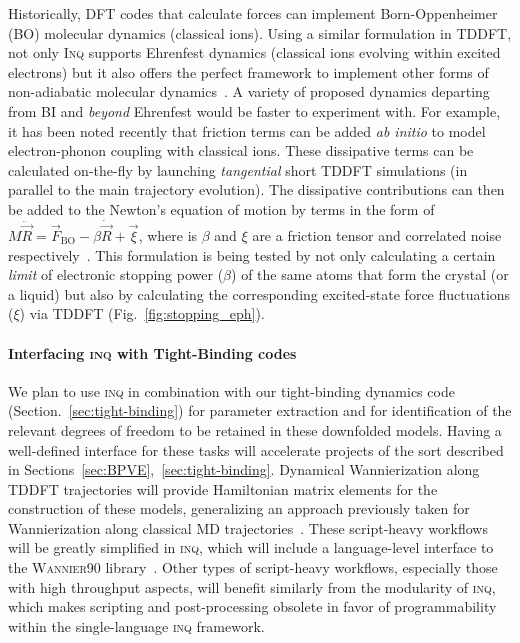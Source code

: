 Historically, DFT codes that calculate forces can implement Born-Oppenheimer (BO) molecular dynamics (classical ions).
Using a similar formulation in TDDFT, not only \textsc{Inq} supports Ehrenfest dynamics (classical ions evolving within excited electrons) but it also offers the perfect framework to implement other forms of non-adiabatic molecular dynamics~\cite{Tapavicza2013,Curchod2018}. 
A variety of proposed dynamics departing from BI and \emph{beyond} Ehrenfest would be faster to experiment with.
For example, it has been noted recently that friction terms can be added \emph{ab initio} to model electron-phonon coupling with classical ions.
These dissipative terms can be calculated on-the-fly by launching \emph{tangential} short TDDFT simulations (in parallel to the main trajectory evolution).
The dissipative contributions can then be added to the Newton's equation of motion by terms in the form of \(M \ddot{\vec{R}} = \vec{F}_\text{BO} - \beta\dot{\vec{R}} + \vec{\xi}\), where is \(\beta\) and \(\xi\) are a friction tensor and correlated noise respectively~\cite{Tamm2018}.
This formulation is being tested by not only calculating a certain \emph{limit} of electronic stopping power (\(\beta\)) of the same atoms that form the crystal (or a liquid) but also by calculating the corresponding excited-state force fluctuations (\(\xi\)) via TDDFT (Fig.~\ref{fig:stopping_eph}).



\paragraph{Interfacing \textsc{inq} with Tight-Binding codes}\label{sec:future-tb}

We plan to use \textsc{inq} in combination with our tight-binding dynamics code (Section.~\ref{sec:tight-binding}) for parameter extraction and for identification of the relevant degrees of freedom to be retained in these downfolded models. 
Having a well-defined interface for these tasks will accelerate projects of the sort described in Sections~\ref{sec:BPVE},~\ref{sec:tight-binding}. Dynamical Wannierization along TDDFT trajectories will provide Hamiltonian matrix elements for the construction of these models, generalizing an approach previously taken for Wannierization along classical MD trajectories~\cite{Abramovitch2021}. 
These script-heavy workflows will be greatly simplified in \textsc{inq}, which will include a language-level interface to the \textsc{Wannier90} library~\cite{Mostofi2008}. 
Other types of script-heavy workflows, especially those with high throughput aspects, will benefit similarly from the modularity of \textsc{inq}, which makes scripting and post-processing obsolete in favor of programmability within the single-language \textsc{inq} framework.

